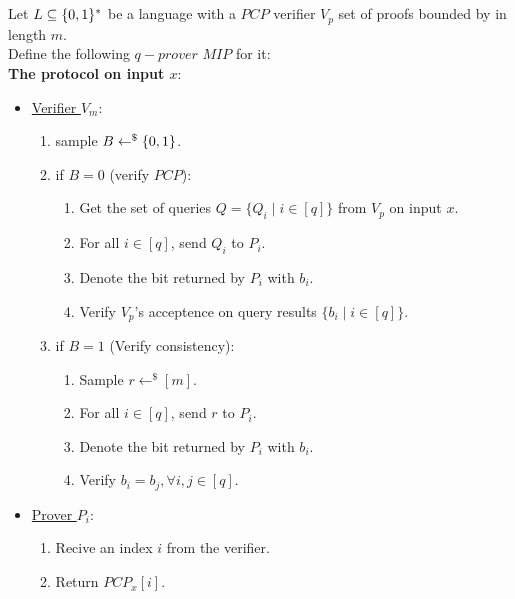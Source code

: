\subsection{}
Let $L\subseteq\{0,1\}^*$ be a language with a $PCP$ verifier $V_p$ set of proofs
bounded by in length $m$.\\
Define the following $q-prover$ $MIP$ for it:\\
\textbf{The protocol on input $x$}:
\begin{itemize}
	\item \underline{Verifier $V_m$}:
		\begin{enumerate}
			\item sample $B\leftarrow^\$\{0,1\}$.
			\item if $B=0$ (verify $PCP$):
			\begin{enumerate}
				\item Get the set of queries $Q=\{Q_i\mid i\in[q]\}$ from $V_p$ on input $x$.
				\item For all $i\in[q]$, send $Q_i$ to $P_i$.
				\item Denote the bit returned by $P_i$ with $b_i$.
				\item Verify $V_p$'s acceptence on query results $\{b_i\mid i\in[q]\}$.
			\end{enumerate}
			\item if $B=1$ (Verify consistency):
			\begin{enumerate}
				\item Sample $r\leftarrow^\$[m]$.
				\item For all $i\in[q]$, send $r$ to $P_i$.
				\item Denote the bit returned by $P_i$ with $b_i$.
				\item Verify $b_i=b_j, \forall i,j\in[q]$.
			\end{enumerate}
		\end{enumerate}
	\item \underline{Prover $P_i$}:
		\begin{enumerate}	
			\item Recive an index $i$ from the verifier.
			\item Return $PCP_x[i]$.
		\end{enumerate}	
\end{itemize}



